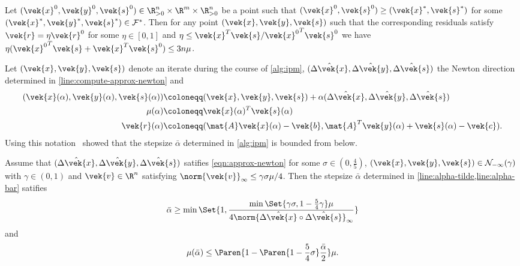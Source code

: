 \begin{lemma}
  Let \((\vek{x}^0, \vek{y}^0, \vek{s}^0) \in \R^n_{>0} \times \R^m \times \R^n_{>0}\) be a point such that \((\vek{x}^0, \vek{s}^0) \geq (\vek{x}^*, \vek{s}^*)\) for some \((\vek{x}^*, \vek{y}^*, \vek{s}^*) \in \mathcal{F}^*\).
  Then for any point \((\vek{x}, \vek{y}, \vek{s})\) such that the corresponding residuals satisfy \(\vek{r} = \eta \vek{r}^0\) for some \(\eta \in [0, 1]\) and \(\eta \leq \vek{x}^T \vek{s} / {\vek{x}^0}^T \vek{s}^0\) we have \(\eta ({\vek{x}^0}^T \vek{s} + \vek{x}^T {\vek{s}^0}) \leq 3 n \mu\).
\end{lemma}

Let \((\vek{x}, \vek{y}, \vek{s})\) denote an iterate during the course of \cref{alg:ipm}, \((\hat{\Delta\vek{x}}, \hat{\Delta\vek{y}}, \hat{\Delta\vek{s}})\) the Newton direction determined in \cref{line:compute-approx-newton} and 
\begin{align}
  (\vek{x}(\alpha), \vek{y}(\alpha), \vek{s}(\alpha)) &\coloneqq (\vek{x}, \vek{y}, \vek{s}) + \alpha (\hat{\Delta\vek{x}}, \hat{\Delta\vek{y}}, \hat{\Delta\vek{s}}) \\
  \mu(\alpha) &\coloneqq \vek{x}(\alpha)^T \vek{s}(\alpha) \\
  \vek{r}(\alpha) &\coloneqq (\mat{A}\vek{x}(\alpha) - \vek{b}, \mat{A}^T \vek{y}(\alpha) + \vek{s}(\alpha) - \vek{c}).
\end{align}
Using this notation~\citeauthor{Monteiro-ConvergenceAnalysisLongStepInfeasibleIPMs} showed that the stepsize \(\bar{\alpha}\) determined in \cref{alg:ipm} is bounded from below.

\begin{lemma}
  Assume that \((\hat{\Delta\vek{x}}, \hat{\Delta\vek{y}}, \hat{\Delta\vek{s}})\) satifies \cref{eqn:approx-newton} for some \(\sigma \in (0, \frac{4}{5})\), \((\vek{x}, \vek{y}, \vek{s}) \in \mathcal{N}_{-\infty}(\gamma)\) with \(\gamma \in (0, 1)\) and \(\vek{v} \in \R^n\) satisfying \(\norm{\vek{v}}_\infty \leq \gamma \sigma \mu / 4\).
  Then the stepsize \(\bar{\alpha}\) determined in \cref{line:alpha-tilde,line:alpha-bar} satifies
  \[ \bar{\alpha} \geq \min \Set{1, \frac{\min \Set{\gamma \sigma, 1 - \frac{5}{4}\gamma} \mu}{4 \norm{\hat{\Delta\vek{x}} \circ \hat{\Delta\vek{s}}}_\infty}} \]
  and
  \[ \mu(\bar{\alpha}) \leq \Paren{1 - \Paren{1 - \frac{5}{4}\sigma} \frac{\bar{\alpha}}{2}} \mu. \]
\end{lemma}

